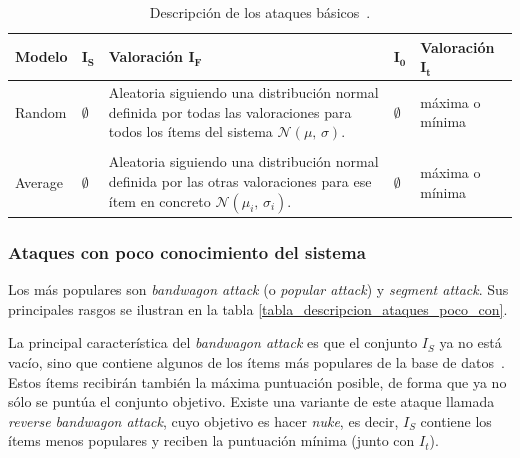 \begin{table}
\small
\begin{centering}

		\begin{tabular}{@{}p{5em} p{2em} p{14em} p{2em} p{7em}@{}}
		\toprule
		\textbf{Modelo} & $\mathbf{I_S}$ & \textbf{Valoración} $\mathbf{I_F}$ & \hfil $\mathbf{I_0}$ & \textbf{Valoración} $\mathbf{I_t}$\\ 
		\midrule
	
		Random & $\emptyset$ & Aleatoria siguiendo una distribución normal definida por todas las valoraciones para todos los ítems del sistema $\mathcal{N}(\mu,\,\sigma)$. & \hfil $\emptyset$ & máxima o mínima \\\\
		
		Average & $\emptyset$ & Aleatoria siguiendo una distribución normal definida por las otras valoraciones para ese ítem en concreto $\mathcal{N}(\mu_i,\,\sigma_i)$. & \hfil $\emptyset$ & máxima o mínima\\
		\bottomrule
		\end{tabular}
	
\end{centering}
\caption[Sistemas de recomendación: ataques básicos]{Descripción de los ataques básicos~\cite{zhou2021SemisupervisedRecommendationAttack}.}
\label{tabla_descripcion_ataques_basicos}	
\end{table}


\subsubsection{Ataques con poco conocimiento del sistema}

Los más populares son \textit{bandwagon attack} (o \textit{popular attack}) y \textit{segment attack}. Sus principales rasgos se ilustran en la tabla \ref{tabla_descripcion_ataques_poco_con}.

La principal característica del \textit{bandwagon attack} es que el conjunto $I_S$ ya no está vacío, sino que contiene algunos de los ítems más populares de la base de datos~\cite{zhou2021SemisupervisedRecommendationAttack}. Estos ítems recibirán también la máxima puntuación posible, de forma que ya no sólo se puntúa el conjunto objetivo. Existe una variante de este ataque llamada \textit{reverse bandwagon attack}, cuyo objetivo es hacer \textit{nuke}, es decir, $I_S$ contiene los ítems menos populares y reciben la puntuación mínima (junto con $I_t$).

